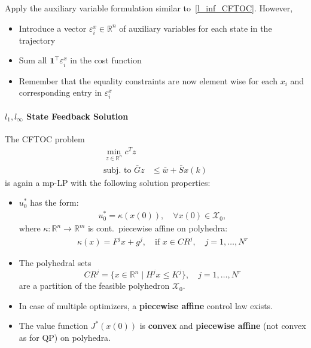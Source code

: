 \newpar{}
Apply the auxiliary variable formulation similar to~\ref{l_inf_CFTOC}. However,
\begin{itemize}
    \item Introduce a vector $\varepsilon_i^x \in \mathbb{R}^n$ of auxiliary variables for each state in the trajectory
    \item Sum all $\mathbf{1}^\top \varepsilon_i^x$ in the cost function
    \item Remember that the equality constraints are now element wise for each $x_i$ and corresponding entry in $\varepsilon_i^x$
\end{itemize}

\paragraph[l1, linf State Feedback Solution]{$l_{1}, l_{\infty}$ State Feedback Solution}

The CFTOC problem
\begin{align*}
    \min_{z\in\mathbb{R}^n}c^T z                            \\
    \text{subj.\ to } \bar{G}z & \leq \bar{w} + \bar{S}x(k)
\end{align*}
is again a mp-LP with the following solution properties:
\begin{itemize}
    \item $u_0^*$ has the form:
          \begin{align*}
              u_0^* = \kappa(x(0)), \quad \forall x(0) \in \mathcal{X}_0,
          \end{align*}
          where $\kappa : \mathbb{R}^n \to \mathbb{R}^m$ is cont.\, piecewise affine on polyhedra:
          \begin{align*}
              \kappa(x) = F^j x + g^j, \quad \text{if } x \in CR^j, \quad j = 1, \dots, N^r
          \end{align*}
    \item The polyhedral sets
          \begin{equation*}
              CR^j = \{x \in \mathbb{R}^n \mid H^j x \leq K^j\}, \quad j = 1, \dots, N^r
          \end{equation*}
          are a partition of the feasible polyhedron $\mathcal{X}_0$.
    \item In case of multiple optimizers, a \textbf{piecewise affine} control law exists.
    \item The value function $J^*(x(0))$ is \textbf{convex} and \textbf{piecewise affine} (not convex as for QP) on polyhedra.
\end{itemize}

